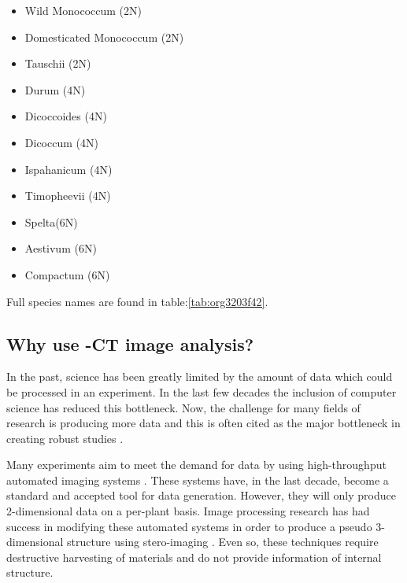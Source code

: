 \documentclass[11pt]{report}
\begin{document}
\begin{multicols}{3}

  \begin{itemize}
  \item Wild Monococcum (2N)
  \item Domesticated Monococcum (2N)
  \item Tauschii (2N)
  \end{itemize}

  \columnbreak

  \begin{itemize}
  \item Durum (4N)
  \item Dicoccoides (4N)
  \item Dicoccum (4N)
  \item Ispahanicum (4N)
  \item Timopheevii (4N)
  \end{itemize}

  \columnbreak

  \begin{itemize}
  \item Spelta(6N)
  \item Aestivum (6N)
  \item Compactum (6N)
  \end{itemize}

\end{multicols}
Full species names are found in table:\ref{tab:org3203f42}.

\subsection{Why use \textmu{}-CT image analysis?}
\label{sec:org0332804}
In the past, science has been greatly limited by the amount of data which could be processed in an experiment. In the last few decades the inclusion of computer science has reduced this bottleneck. Now, the challenge for many fields of research is producing more data and this is often cited as the major bottleneck in creating robust studies \cite{Furbank2011}.

Many experiments aim to meet the demand for data by using high-throughput automated imaging systems \cite{Naumann2007,Prasanna2013,Humplik2015}. These systems have, in the last decade, become a standard and accepted tool for data generation. However, they will only produce 2-dimensional data on a per-plant basis. Image processing research has had success in modifying these automated systems in order to produce a pseudo 3-dimensional structure using stero-imaging \cite{Roussel2016}. Even so, these techniques require destructive harvesting of materials and do not provide information of internal structure.
\end{document}
